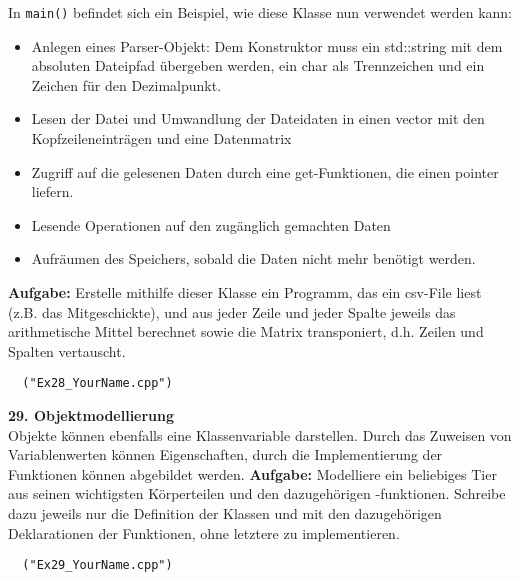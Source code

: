 \documentclass[paper=A4, pagesize, DIV=calc, smallheadings,
fontsize=11pt, expansion=false]{scrreprt}
\begin{document}
In \texttt{main()} befindet sich ein Beispiel, wie diese Klasse nun verwendet werden kann: 
  \begin{itemize}
  \item Anlegen eines Parser-Objekt: Dem Konstruktor muss ein std::string mit dem absoluten Dateipfad übergeben werden, ein char als Trennzeichen und ein Zeichen für den Dezimalpunkt.
  \item Lesen der Datei und Umwandlung der Dateidaten in einen vector mit den Kopfzeileneinträgen und eine Datenmatrix
  \item Zugriff auf die gelesenen Daten durch eine get-Funktionen, die einen pointer liefern.
  \item Lesende Operationen auf den zugänglich gemachten Daten
  \item Aufräumen des Speichers, sobald die Daten nicht mehr benötigt werden.
  \end{itemize}  
  \textbf{Aufgabe:} Erstelle mithilfe dieser Klasse ein Programm, das ein csv-File liest (z.B. das Mitgeschickte), und aus jeder Zeile und jeder Spalte jeweils das arithmetische Mittel berechnet sowie die Matrix transponiert, d.h. Zeilen und Spalten vertauscht.
\begin{verbatim}
  ("Ex28_YourName.cpp")
\end{verbatim}

 \textbf{29. Objektmodellierung}\\ 
  Objekte können ebenfalls eine Klassenvariable darstellen. Durch das Zuweisen von Variablenwerten können Eigenschaften, durch die Implementierung der Funktionen können abgebildet werden.  
  \textbf{Aufgabe:} Modelliere ein beliebiges Tier aus seinen wichtigsten Körperteilen und den dazugehörigen -funktionen.
  Schreibe dazu jeweils nur die Definition der Klassen und mit den dazugehörigen Deklarationen der Funktionen, ohne letztere zu implementieren.  
\begin{verbatim}
  ("Ex29_YourName.cpp")
\end{verbatim}
\end{document}
